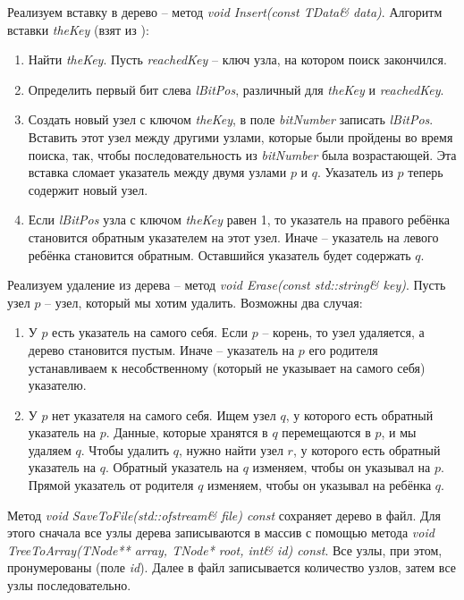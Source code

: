 Реализуем вставку в дерево -- метод \textit{void Insert(const TData\& data)}. Алгоритм вставки
\textit{theKey} (взят из \cite{Mehta}):
\begin{enumerate}
	\item Найти \textit{theKey}. Пусть \textit{reachedKey} -- ключ узла, на котором поиск закончился.
	\item Определить первый бит слева \textit{lBitPos}, различный для \textit{theKey} и \textit{reachedKey}.
	\item Создать новый узел с ключом \textit{theKey}, в поле \textit{bitNumber} записать \textit{lBitPos}.
	Вставить этот узел между другими узлами, которые были пройдены во время поиска, так, чтобы последовательность 
	из \textit{bitNumber} была возрастающей. Эта вставка сломает указатель между двумя узлами $p$ и $q$.
	Указатель из $p$ теперь содержит новый узел.
	\item Если \textit{lBitPos} узла с ключом \textit{theKey} равен 1, то указатель на правого ребёнка становится 
	обратным указателем на этот узел. Иначе -- указатель на левого ребёнка становится обратным. Оставшийся
	указатель будет содержать $q$.
\end{enumerate}

Реализуем удаление из дерева -- метод \textit{void Erase(const std::string\& key)}. Пусть узел $p$ -- узел, который
мы хотим удалить. Возможны два случая:
\begin{enumerate}
	\item У $p$ есть указатель на самого себя. Если $p$ -- корень, то узел удаляется, а дерево становится пустым.
	Иначе -- указатель на $p$ его родителя устанавливаем к несобственному (который не указывает на самого себя) указателю.
	\item У $p$ нет указателя на самого себя. Ищем узел $q$, у которого есть обратный указатель на $p$. Данные, которые 
	хранятся в $q$ перемещаются в $p$, и мы удаляем $q$. Чтобы удалить $q$, нужно найти узел $r$, у которого есть
	обратный указатель на $q$. Обратный указатель на $q$ изменяем, чтобы он указывал на $p$. Прямой указатель от родителя
	$q$ изменяем, чтобы он указывал на ребёнка $q$.
\end{enumerate}

Метод \textit{void SaveToFile(std::ofstream\& file) const} сохраняет дерево в файл. Для этого сначала все узлы дерева записываются
в массив с помощью метода \textit{void TreeToArray(TNode** array, TNode* root, int\& id) const}. Все узлы, при этом, пронумерованы (поле \textit{id}).
Далее в файл записывается количество узлов, затем все узлы последовательно.

